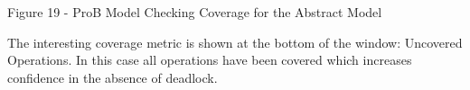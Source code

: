 Figure 19 - ProB Model Checking Coverage for the Abstract Model

The interesting coverage metric is shown at the bottom of the window: Uncovered Operations. In this case all operations have been covered which increases confidence in the absence of deadlock.

